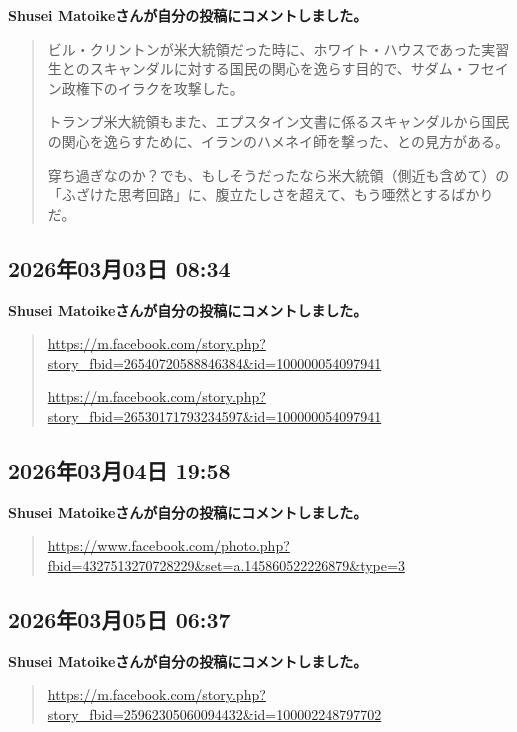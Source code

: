 \textbf{Shusei Matoikeさんが自分の投稿にコメントしました。}

\begin{quote}
ビル・クリントンが米大統領だった時に、ホワイト・ハウスであった実習生とのスキャンダルに対する国民の関心を逸らす目的で、サダム・フセイン政権下のイラクを攻撃した。

トランプ米大統領もまた、エプスタイン文書に係るスキャンダルから国民の関心を逸らすために、イランのハメネイ師を撃った、との見方がある。

穿ち過ぎなのか？でも、もしそうだったなら米大統領（側近も含めて）の「ふざけた思考回路」に、腹立たしさを超えて、もう唖然とするばかりだ。
\end{quote}

\subsection*{2026年03月03日 08:34}

\textbf{Shusei Matoikeさんが自分の投稿にコメントしました。}

\begin{quote}
\url{https://m.facebook.com/story.php?story_fbid=26540720588846384&id=100000054097941}

\url{https://m.facebook.com/story.php?story_fbid=26530171793234597&id=100000054097941}
\end{quote}

\subsection*{2026年03月04日 19:58}

\textbf{Shusei Matoikeさんが自分の投稿にコメントしました。}

\begin{quote}
\url{https://www.facebook.com/photo.php?fbid=4327513270728229&set=a.145860522226879&type=3}
\end{quote}

\subsection*{2026年03月05日 06:37}

\textbf{Shusei Matoikeさんが自分の投稿にコメントしました。}

\begin{quote}
\url{https://m.facebook.com/story.php?story_fbid=25962305060094432&id=100002248797702}
\end{quote}

